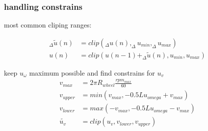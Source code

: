 \documentclass{beamer}
\begin{document}
\begin{frame}
  
  \frametitle{\bf handling constrains}

  most common cliping ranges: 
 
  \begin{align*}
    _\Delta\tilde{u}(n) &= clip(_{\Delta}u(n), _\Delta u_{min}, _\Delta u_{max}) \\
    u(n) &= clip(u(n-1) + _\Delta\tilde{u}(n), u_{min}, u_{max})
  \end{align*}

  keep $u_{\omega}$ maximum possible and find constrains for $u_v$
  \begin{align*}
    v_{max} &= 2\pi R_{wheel}\frac{rpm_{max}}{60} \\
    v_{upper} &= min(v_{max}, -0.5Lu_{omega} + v_{max}) \\
    v_{lower} &= max(-v_{max}, -0.5Lu_{omega} - v_{max}) \\
    \tilde{u_v} &= clip(u_v, v_{lower}, v_{upper})
  \end{align*}
 

\end{frame}
\end{document}

